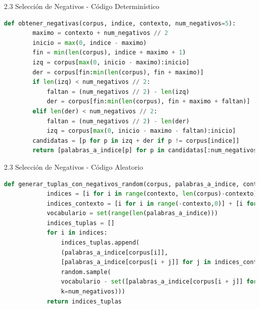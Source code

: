 \documentclass{beamer}
\begin{document}
\begin{frame}[fragile]{2.3 Selección de Negativos - Código Determinístico}
	\begin{block}{}
		\begin{lstlisting}[language=Python]
def obtener_negativas(corpus, indice, contexto, num_negativos=5):
		maximo = contexto + num_negativos // 2
		inicio = max(0, indice - maximo)
		fin = min(len(corpus), indice + maximo + 1)
		izq = corpus[max(0, inicio - maximo):inicio]
		der = corpus[fin:min(len(corpus), fin + maximo)]
		if len(izq) < num_negativos // 2:
			faltan = (num_negativos // 2) - len(izq)
			der = corpus[fin:min(len(corpus), fin + maximo + faltan)]
		elif len(der) < num_negativos // 2:
			faltan = (num_negativos // 2) - len(der)
			izq = corpus[max(0, inicio - maximo - faltan):inicio]
		candidatas = [p for p in izq + der if p != corpus[indice]]
		return [palabras_a_indice[p] for p in candidatas[:num_negativos]]
		\end{lstlisting}
	\end{block}
\end{frame}

\begin{frame}[fragile]{2.3 Selección de Negativos - Código Aleatorio}
	\begin{block}{}
		\begin{lstlisting}[language=Python]
def generar_tuplas_con_negativos_random(corpus, palabras_a_indice, contexto, num_negativos):
			indices = [i for i in range(contexto, len(corpus)-contexto)]
			indices_contexto = [i for i in range(-contexto,0)] + [i for i in range(1,contexto+1)]
			vocabulario = set(range(len(palabras_a_indice)))
			indices_tuplas = []
			for i in indices:
				indices_tuplas.append(
				(palabras_a_indice[corpus[i]],
				[palabras_a_indice[corpus[i + j]] for j in indices_contexto],
				random.sample(
				vocabulario - set([palabras_a_indice[corpus[i + j]] for j in indices_contexto]),
				k=num_negativos)))
			return indices_tuplas
		\end{lstlisting}
	\end{block}
\end{frame}

	
	
	
	
	
	
\end{document}
